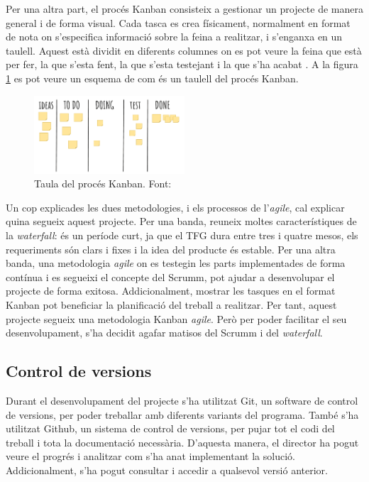 \documentclass[a4paper]{article}
\begin{document}
Per una altra part, el procés Kanban consisteix a gestionar un projecte de manera general i de forma visual. Cada tasca es crea físicament, normalment en format de nota  on s'especifica informació sobre la feina a realitzar, i s'enganxa en un taulell. Aquest està dividit en diferents columnes on es pot veure la feina que està per fer, la que s'esta fent, la que s'esta testejant i la que s'ha acabat \cite{kanbanWeb}. A la figura \ref{fig:KanbanImage} es pot veure un esquema de com és un taulell del procés Kanban.

\begin{figure}[H]
    \centering
    \includegraphics[width=0.5\textwidth]{images/Kanban.png}
    \caption{Taula del procés Kanban. Font: \cite{kanbanImage}}
    \label{fig:KanbanImage}
\end{figure}

Un cop explicades les dues metodologies, i els processos de l'\textit{agile}, cal explicar quina segueix aquest projecte. Per una banda, reuneix moltes característiques de la \textit{waterfall}: és un període curt, ja que el TFG dura entre tres i quatre mesos, els requeriments són clars i fixes i la idea del producte és estable. Per una altra banda, una metodologia \textit{agile} on es testegin les parts implementades de forma contínua i es segueixi el concepte del Scrumm, pot ajudar a desenvolupar el projecte de forma exitosa. Addicionalment, mostrar les tasques en el format Kanban pot beneficiar la planificació del treball a realitzar. Per tant, aquest projecte segueix una metodologia Kanban \textit{agile}. Però per poder facilitar el seu desenvolupament, s'ha decidit agafar matisos del Scrumm i del \textit{waterfall}.

\subsection{Control de versions}

Durant el desenvolupament del projecte s'ha utilitzat Git, un software de control de versions, per poder treballar amb diferents variants del programa. També s'ha utilitzat Github, un sistema de control de versions, per pujar tot el codi del treball i tota la documentació necessària. D'aquesta manera, el director ha pogut veure el progrés i analitzar com s'ha anat implementant la solució. Addicionalment, s'ha pogut consultar i accedir a qualsevol versió anterior.
\end{document}
